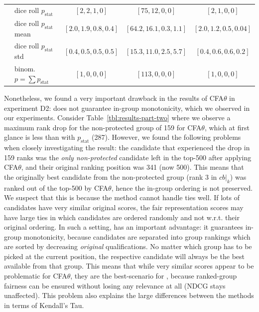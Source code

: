 \begin{table}[t!]
{\begin{tabular}{llccc}
									& dice roll $p_{\text{stat}}$ 	& $[2, 2, 1, 0]$ & $[75, 12, 0, 0]$ 	& $[2, 1, 0, 0]$ \\
									& dice roll $p_{\text{stat}}$ mean	& $[2.0, 1.9, 0.8, 0.4]$ & $[64.2, 16.1, 0.3, 1.1]$ 	& $[2.0, 1.2, 0.5, 0.04]$ \\
									& dice roll $p_{\text{stat}}$ std	& $[0.4, 0.5, 0.5, 0.5]$ & $[15.3, 11.0, 2.5, 5.7]$ 	& $[0.4, 0.6, 0.6, 0.2]$ \\
								& binom. \algoFAIR $p = \sum p_{\text{stat}}$	& $[1,0,0, 0]$		& $[113,0,0, 0]$		& $[1,0,0, 0]$ 	 \\													
			\bottomrule
		\end{tabular}
	}
\end{table}
%
Nonetheless, we found a very important drawback in the results of CFA$\theta$ in experiment D2: \citet{zehlike2020matching} does not guarantee in-group monotonicity, which we observed in our experiments.
%
Consider Table~\ref{tbl:results-part-two} where we observe a maximum rank drop for the non-protected group of 159 for CFA$\theta$, which at first glance is less than \algoFAIR with $p_{\text{stat}}$ (287).
%
However, we found the following problems when closely investigating the result: the candidate that experienced the drop in 159 ranks was the \emph{only non-protected} candidate left in the top-500 after applying CFA$\theta$, and their original ranking position was 341 (now 500).
%
This means that the originally best candidate from the non-protected group (rank 3 in $cb|_k$) was ranked out of the top-500 by CFA$\theta$, hence the in-group ordering is not preserved.
%
We suspect that this is because the method cannot handle ties well.  %
%
If lots of candidates have very similar original scores, the fair representation scores may have large ties in which candidates are ordered randomly and not w.r.t. their original ordering.
%
In such a setting, \algoFAIR has an important advantage: it guarantees in-group monotonicity, because candidates are separated into group rankings which are sorted by decreasing \emph{original} qualifications.
%
No matter which group has to be picked at the current position, the respective candidate will always be the best available from that group.
%
This means that while very similar scores appear to be problematic for CFA$\theta$, they are the best-scenario for \algoFAIR, because ranked-group fairness can be ensured without losing any relevance at all (NDCG stays unaffected).
%
This problem also explains the large differences between the methods in terms of Kendall's Tau.

